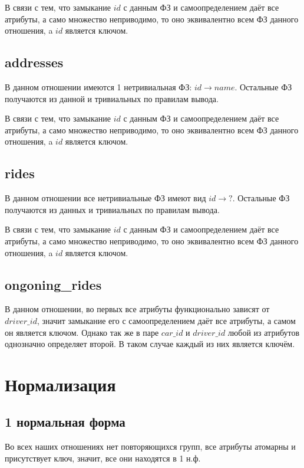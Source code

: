 \documentclass[fontsize=12pt]{article}
\begin{document}
В связи с тем, что замыкание $id$ с данным ФЗ и самоопределением даёт все атрибуты, а само множество неприводимо, то оно эквивалентно всем ФЗ данного отношения, a $id$ является ключом.

\subsection{addresses}

В данном отношении имеются 1 нетривиальная ФЗ: $id \rightarrow name$. Остальные ФЗ получаются из данной и тривиальных по правилам вывода. 

В связи с тем, что замыкание $id$ с данным ФЗ и самоопределением даёт все атрибуты, а само множество неприводимо, то оно эквивалентно всем ФЗ данного отношения, a $id$ является ключом.

\subsection{rides}

В данном отношении все нетривиальные ФЗ имеют вид $id \rightarrow ?$. Остальные ФЗ получаются из данных и тривиальных по правилам вывода. 

В связи с тем, что замыкание $id$ с данным ФЗ и самоопределением даёт все атрибуты, а само множество неприводимо, то оно эквивалентно всем ФЗ данного отношения, a $id$ является ключом.

\subsection{ongoning\_rides}

В данном отношении, во первых все атрибуты функционально зависят от $driver\_id$, значит замыкание его с самоопределением  даёт все атрибуты, а самом он является ключом. Однако так же в паре $car\_id$ и $driver\_id$ любой из атрибутов однозначно определяет второй. В таком случае каждый из них является ключём. 

\section{Нормализация}

\subsection*{1 нормальная форма}

Во всех наших отношениях нет повторяющихся групп, все атрибуты атомарны и присутствует ключ, значит, все они находятся в 1 н.ф.
\end{document}
